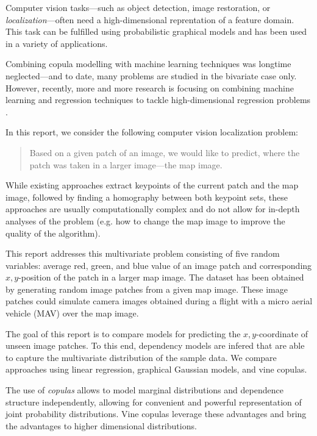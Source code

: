 \documentclass{article}
\begin{document}
Computer vision tasks---such as object detection, image restoration,
or \emph{localization}---often need a high-dimensional reprentation of
a feature domain. This task can be fulfilled using probabilistic
graphical models and has been used in a variety of applications.

Combining copula modelling with machine learning techniques was
longtime neglected---and to date, many problems are studied in the
bivariate case only. However, recently, more and more research is
focusing on combining machine learning and regression techniques to
tackle high-dimensional regression problems
\parencite{cooke2015vine,elidan2013copulas}.

In this report, we consider the following computer vision localization
problem:
\begin{quote}
  Based on a given patch of an image, we would like to predict, where
  the patch was taken in a larger image---the map image.
\end{quote}
While existing approaches extract keypoints of the current patch and
the map image, followed by finding a homography between both keypoint
sets, these approaches are usually computationally complex and do not
allow for in-depth analyses of the problem (e.g. how to change the map
image to improve the quality of the algorithm).

This report addresses this multivariate problem consisting of five
random variables: average red, green, and blue value of an image patch
and corresponding $x, y$-position of the patch in a larger map
image. The dataset has been obtained by generating random image
patches from a given map image. These image patches could simulate
camera images obtained during a flight with a micro aerial vehicle
(MAV) over the map image.


The goal of this report is to compare models for predicting the
$x,y$-coordinate of unseen image patches. To this end, dependency
models are infered that are able to capture the multivariate
distribution of the sample data. We compare approaches using linear
regression, graphical Gaussian models, and vine copulas.

The use of \emph{copulas} allows to model marginal
distributions and dependence structure independently, allowing for
convenient and powerful representation of joint probability
distributions. Vine copulas leverage these advantages and bring the
advantages to higher dimensional distributions.
\end{document}
